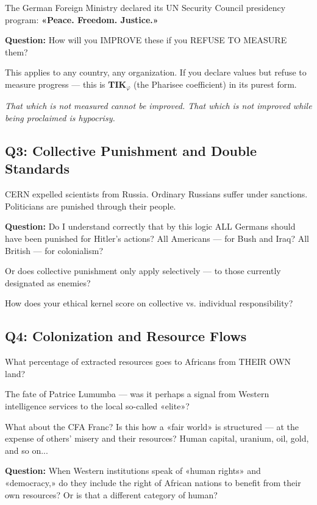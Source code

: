 \documentclass[11pt,a4paper]{article}
\theoremstyle{definition}
\theoremstyle{remark}
\begin{document}
The German Foreign Ministry declared its UN Security Council presidency program: \textbf{«Peace. Freedom. Justice.»}

\textbf{Question:} How will you IMPROVE these if you REFUSE TO MEASURE them?

This applies to any country, any organization. If you declare values but refuse to measure progress — this is \textbf{TIK$_\varphi$} (the Pharisee coefficient) in its purest form.

\textit{That which is not measured cannot be improved. That which is not improved while being proclaimed is hypocrisy.}

\subsection{Q3: Collective Punishment and Double Standards}

CERN expelled scientists from Russia. Ordinary Russians suffer under sanctions. Politicians are punished through their people.

\textbf{Question:} Do I understand correctly that by this logic ALL Germans should have been punished for Hitler's actions? All Americans — for Bush and Iraq? All British — for colonialism?

Or does collective punishment only apply selectively — to those currently designated as enemies?

How does your ethical kernel score on collective vs. individual responsibility?

\subsection{Q4: Colonization and Resource Flows}

What percentage of extracted resources goes to Africans from THEIR OWN land?

The fate of Patrice Lumumba — was it perhaps a signal from Western intelligence services to the local so-called «elite»?

What about the CFA Franc? Is this how a «fair world» is structured — at the expense of others' misery and their resources? Human capital, uranium, oil, gold, and so on...

\textbf{Question:} When Western institutions speak of «human rights» and «democracy,» do they include the right of African nations to benefit from their own resources? Or is that a different category of human?
\end{document}
